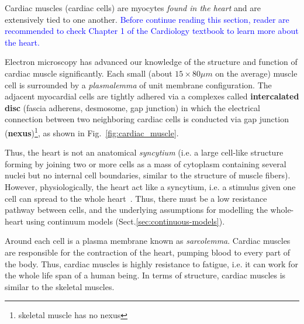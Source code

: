 Cardiac muscles (cardiac cells) are myocytes {\it found in the heart} and are
extensively tied to one another.  \textcolor{blue}{Before continue reading this
section, reader are recommended to check Chapter 1 of the Cardiology textbook to
learn more about the heart.}


Electron microscopy has advanced our knowledge of the structure and
function of cardiac muscle significantly.  Each small (about $15\times 80\mu m$
on the average) muscle cell is surrounded by a {\it plasmalemma} of unit
membrane configuration. The adjacent myocardial cells are tightly adhered via a
complexes called {\bf intercalated disc} (fascia adherens, desmosome, gap
junction) in which the electrical connection between two neighboring cardiac
cells is conducted via gap junction ({\bf nexus})\footnote{skeletal muscle has
no nexus}, as shown in Fig.~\ref{fig:cardiac_muscle}.


Thus, the heart is not an anatomical {\it syncytium} (i.e. a large cell-like
structure forming by joining two or more cells as a mass of cytoplasm containing
several nuclei but no internal cell boundaries, similar to the structure of
muscle fibers). However, physiologically, the heart act like a syncytium, i.e. a
stimulus given one cell can spread to the whole heart~\cite{sommer1978uhm}. 
Thus, there must be a low resistance pathway between cells, and the underlying
assumptions for modelling the whole-heart using continuum models
(Sect.\ref{sec:continuous-models}).



Around each cell is a plasma membrane known as {\it sarcolemma}.
Cardiac muscles are responsible for the contraction of the heart,
pumping blood to every part of the body.  Thus, cardiac muscles is
highly resistance to fatigue, i.e. it can work for the whole life span
of a human being. In terms of structure, cardiac muscles is similar to
the skeletal muscles.

